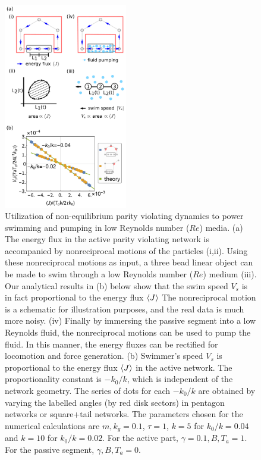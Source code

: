 \documentclass[
 preprint,
 preprintnumbers,
 amsmath,amssymb,
 aps,
 pre,
 longbibliography,
 superscriptaddress,
 10pt, twocolumn
]{revtex4-1}
\begin{document}
\begin{figure}[tbp]
	\centering
	\includegraphics[width=0.48\textwidth]{swimmer.pdf}
    \caption{Utilization of non-equilibrium parity violating dynamics to power swimming and pumping in low Reynolds number ($Re$) media.
    (a) The energy flux in the active parity violating network is accompanied by nonreciprocal motions of the particles (i,ii). Using these nonreciprocal motions as input, a three bead linear object can be made to swim through a low Reynolds number ($Re$) medium (iii). Our analytical results in (b) below show that the swim speed $V_s$ is in fact proportional to the energy flux $\expval{J}$ The nonreciprocal motion is a schematic for illustration purposes, and the real data is much more noisy. (iv) Finally by immersing the passive segment into a low Reynolds fluid, the nonreciprocal motions can be used to pump the fluid. In this manner, the energy fluxes can be rectified for locomotion and force generation. 
    (b) Swimmer's speed $V_s$ is proportional to the energy flux $\expval{J}$ in the active network. The proportionality constant is $-k_0/k$, which is independent of the network geometry. The series of dots for each $-k_0/k$ are obtained by varying the labelled angles (by red disk sectors) in pentagon networks or square+tail networks. The parameters chosen for the numerical calculations are $m,k_g=0.1$, $\tau=1$, $k=5$ for $k_0/k=0.04$ and $k=10$ for $k_0/k=0.02$. For the active part, $\gamma=0.1, B,T_a=1$. For the passive segment, $\gamma,B,T_a=0$.
    }
    \label{fig:swimmer}
\end{figure}
\end{document}
